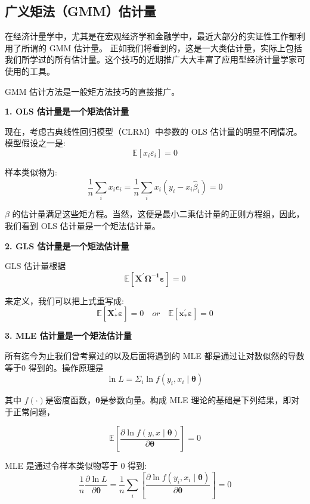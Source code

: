 \subsection{广义矩法（GMM）估计量}

    在经济计量学中，尤其是在宏观经济学和金融学中，最近大部分的实证性工作都利用了所谓的 GMM 估计量。
    正如我们将看到的，这是一大类估计量，实际上包括我们所学过的所有估计量。这个技巧的近期推广大大丰富了应用型经济计量学家可使用的工具。

    GMM 估计方法是一般矩方法技巧的直接推广。
    
   {\bf  1. OLS 估计量是一个矩法估计量}

   现在，考虑古典线性回归模型（CLRM）中参数的 OLS 估计量的明显不同情况。模型假设之一是:
   $$ \mathbb{E}\left[x_{i} \varepsilon_{i}\right]=0 $$

   样本类似物为:
   $$ \frac{1}{n} \sum_{i} x_{i} e_{i}=\frac{1}{n} \sum_{i} x_{i}\left(y_{i}-x_{i} \hat{\beta}_{i} \right)=0 $$

   $ \beta $ 的估计量满足这些矩方程。当然，这便是最小二乘估计量的正则方程组，因此，我们看到 OLS 估计量是一个矩法估计量。

   {\bf  2. GLS 估计量是一个矩法估计量} 

   GLS 估计量根据
   $$ \mathbb{E}\left[\boldsymbol{X^{\prime} \Omega^{-1} \varepsilon}\right]=0 $$



   来定义，我们可以把上式重写成:
   $$   \mathbb{E}\left[ \boldsymbol{X_{*}^{\prime} \varepsilon} \right] 
            = 0 \quad or \quad \mathbb{E}\left[\boldsymbol{x_{*}^{\prime} \varepsilon}\right]=0 $$

   {\bf 3. MLE 估计量是一个矩法估计量}

   所有迄今为止我们曾考察过的以及后面将遇到的 MLE 都是通过让对数似然的导数等于0 得到的。操作原理是
   $$ \ln L=\Sigma_{i} \ln f\left(y_{i}, x_{i} \mid \boldsymbol{\theta} \right) $$

   其中 $f(\cdot)$是密度函数，$ \boldsymbol{\theta} $是参数向量。构成 MLE 理论的基础是下列结果，即对于正常问题，

   $$ \mathbb{E}\left[\frac{\partial \ln f(y, x \mid \boldsymbol{\theta} )}{\partial \boldsymbol{\theta}}\right]=0 $$

   MLE 是通过令样本类似物等于 0 得到:
   $$ \frac{1}{n} \frac{\partial \ln L}{\partial \boldsymbol{\theta} }=\frac{1}{n} \sum_{i}
       \left[\frac{\partial \ln f \left(y_{i}, x_{i} \mid \boldsymbol{\theta} \right)}{\partial \boldsymbol{\theta}}\right]=0 $$

